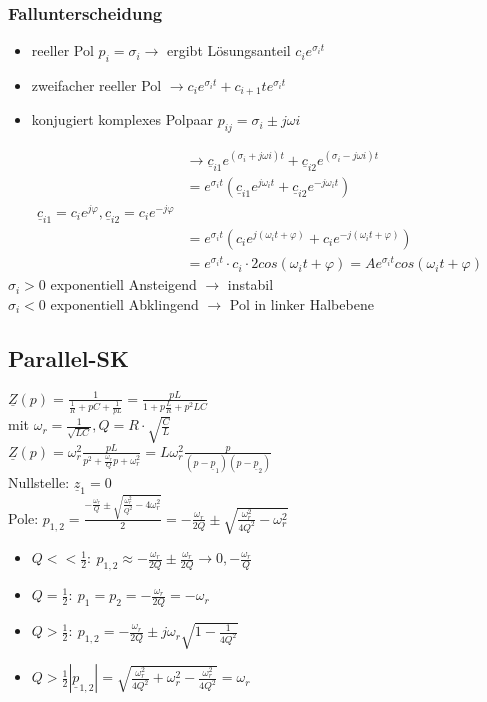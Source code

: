 \subsubsection{Fallunterscheidung}
\begin{itemize}
  \item reeller Pol $p_i=\sigma_i \rightarrow$ ergibt Lösungsanteil
  $c_ie^{\sigma_it}$
  \item zweifacher reeller Pol $\rightarrow
  c_ie^{\sigma_it}+c_{i+1}te^{\sigma_it}$
  \item konjugiert komplexes Polpaar $p_{ij}=\sigma_i\pm j\omega i$
\end{itemize}
\begin{align}
  &\rightarrow \underline{c}_{i1}e^{(\sigma_i+j\omega
  i)t}+\underline{c}_{i2}e^{(\sigma_i-j\omega i)t}\nonumber\\
  &=e^{\sigma_it}\left(\underline{c}_{i1}e^{j\omega_it}+\underline{c}_{i2}e^{-j\omega_it}\right)\nonumber\\
  \underline{c}_{i1}=c_ie^{j\varphi},
  \underline{c}_{i2}=c_ie^{-j\varphi}\nonumber\\
  &=e^{\sigma_it}\left(c_ie^{j\left(\omega_it+\varphi\right)}+c_ie^{-j\left(\omega_it+\varphi\right)}\right)\nonumber\\
  &=e^{\sigma_it}\cdot
  c_i\cdot2cos(\omega_it+\varphi)=Ae^{\sigma_it}cos(\omega_it+\varphi)\nonumber
\end{align}
$\sigma_i > 0$ exponentiell Ansteigend $\rightarrow$ instabil\\
$\sigma_i < 0$ exponentiell Abklingend $\rightarrow$ Pol in linker Halbebene\\

\subsection{Parallel-SK}
$\underline{Z}(p)=\frac{1}{\frac{1}{R}+pC+\frac{1}{pL}}=\frac{pL}{1+p\frac{L}{R}+p^2LC}$\\
mit $\omega_r=\frac{1}{\sqrt{LC}}, Q=R\cdot\sqrt{\frac{C}{L}}$\\
$\underline{Z}(p)=\omega_r^2\frac{pL}{p^2+\frac{\omega_r}{Q}p+\omega_r^2}=L\omega_r^2
\frac{p}{(p-\underline{p}_1)(p-\underline{p}_2)}$\\
Nullstelle: $\underline{z}_1=0$\\
Pole:
$p_{1,2}=\frac{-\frac{\omega_r}{Q}\pm\sqrt{\frac{\omega_r^2}{Q^2}-4\omega_r^2}}{2}=-\frac{\omega_r}{2Q}\pm\sqrt{\frac{\omega_r^2}{4Q^2}-\omega_r^2}$\\
\begin{itemize}
  \item $Q<<\frac{1}{2}:\
  p_{1,2}\approx-\frac{\omega_r}{2Q}\pm\frac{\omega_r}{2Q}\rightarrow 0,
  -\frac{\omega_r}{Q}$
  \item $Q=\frac{1}{2}:\ p_1=p_2=-\frac{\omega_r}{2Q}=-\omega_r$
  \item $Q>\frac{1}{2}:\ p_{1,2}=-\frac{\omega_r}{2Q}\pm
  j\omega_r\sqrt{1-\frac{1}{4Q^2}}$
  \item $Q>\frac{1}{2}
  |\underline{p}_{1,2}|=\sqrt{\frac{\omega_r^2}{4Q^2}+\omega_r^2-\frac{\omega_r^2}{4Q^2}}=\omega_r$
\end{itemize}